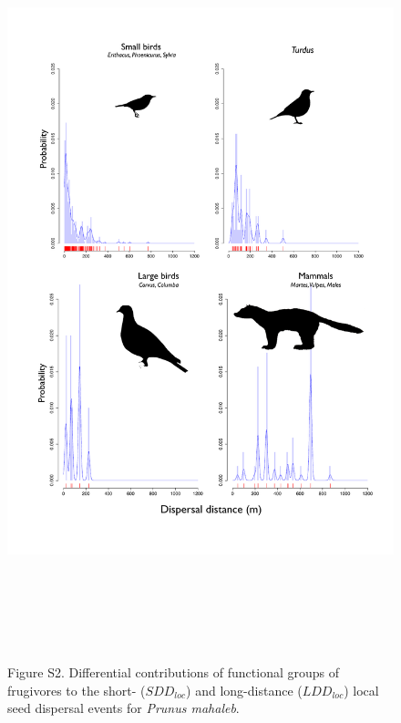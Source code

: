 \documentclass[a4paper, 12pt]{article}
\begin{document}
\begin{figure}[htbp]
\centerline{\includegraphics[height=22cm]{FigS2.pdf}}
%
\caption*{Figure S2. Differential contributions of functional groups of frugivores to the short- ($SDD_{loc}$) and long-distance ($LDD_{loc}$) local seed dispersal events for \textit{Prunus mahaleb}.}
\end{figure}

\newpage 



	
\end{document}
